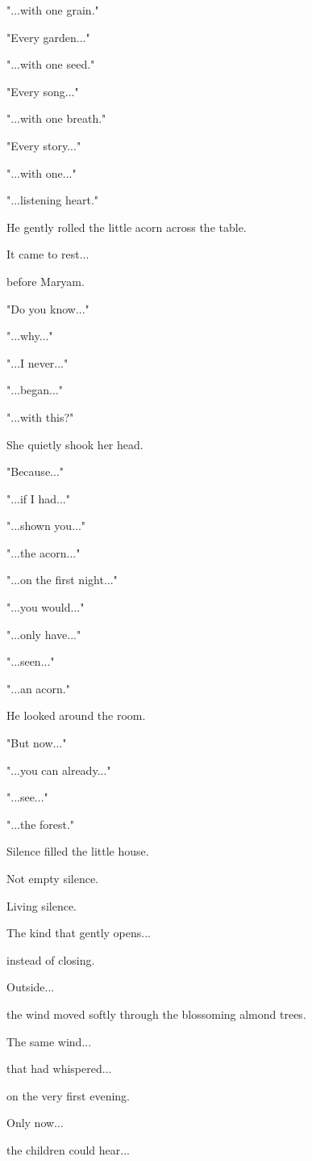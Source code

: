 \documentclass[12pt,openany]{book}
\begin{document}
"...with one grain."

"Every garden..."

"...with one seed."

"Every song..."

"...with one breath."

"Every story..."

"...with one..."

"...listening heart."

He gently rolled the little acorn across the table.

It came to rest...

before Maryam.

"Do you know..."

"...why..."

"...I never..."

"...began..."

"...with this?"

She quietly shook her head.

"Because..."

"...if I had..."

"...shown you..."

"...the acorn..."

"...on the first night..."

"...you would..."

"...only have..."

"...seen..."

"...an acorn."

He looked around the room.

"But now..."

"...you can already..."

"...see..."

"...the forest."

Silence filled the little house.

Not empty silence.

Living silence.

The kind that gently opens...

instead of closing.

Outside...

the wind moved softly through the blossoming almond trees.

The same wind...

that had whispered...

on the very first evening.

Only now...

the children could hear...
\end{document}
